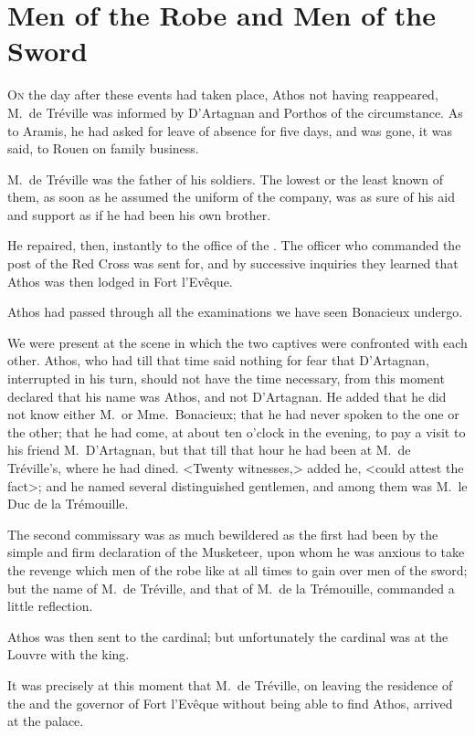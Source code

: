 
\chapter{Men of the Robe and Men of the Sword}

\lettrine{O}{n} the day after these events had taken place, Athos not having reappeared, M.~de Tréville was informed by D'Artagnan and Porthos of the circumstance. As to Aramis, he had asked for leave of absence for five days, and was gone, it was said, to Rouen on family business. 

M.~de Tréville was the father of his soldiers. The lowest or the least known of them, as soon as he assumed the uniform of the company, was as sure of his aid and support as if he had been his own brother. 

He repaired, then, instantly to the office of the . The officer who commanded the post of the Red Cross was sent for, and by successive inquiries they learned that Athos was then lodged in Fort l'Evêque. 

Athos had passed through all the examinations we have seen Bonacieux undergo. 

We were present at the scene in which the two captives were confronted with each other. Athos, who had till that time said nothing for fear that D'Artagnan, interrupted in his turn, should not have the time necessary, from this moment declared that his name was Athos, and not D'Artagnan. He added that he did not know either M.~or Mme.~Bonacieux; that he had never spoken to the one or the other; that he had come, at about ten o'clock in the evening, to pay a visit to his friend M.~D'Artagnan, but that till that hour he had been at M.~de Tréville's, where he had dined. <Twenty witnesses,> added he, <could attest the fact>; and he named several distinguished gentlemen, and among them was M.~le Duc de la Trémouille. 

The second commissary was as much bewildered as the first had been by the simple and firm declaration of the Musketeer, upon whom he was anxious to take the revenge which men of the robe like at all times to gain over men of the sword; but the name of M.~de Tréville, and that of M.~de la Trémouille, commanded a little reflection. 

Athos was then sent to the cardinal; but unfortunately the cardinal was at the Louvre with the king. 

It was precisely at this moment that M.~de Tréville, on leaving the residence of the  and the governor of Fort l'Evêque without being able to find Athos, arrived at the palace. 

